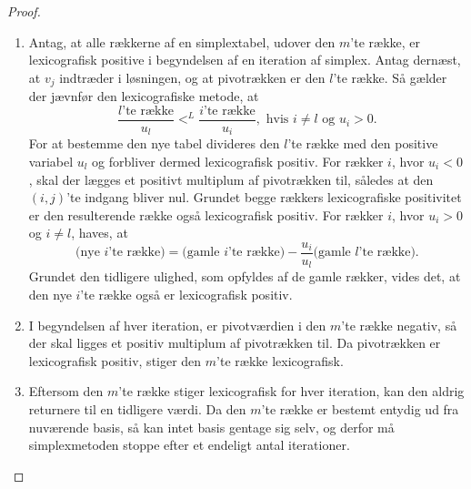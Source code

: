 \begin{proof}
\begin{enumerate}[label=(\alph*)]
\item Antag, at alle rækkerne af en simplextabel, udover den $m$'te række, er lexicografisk positive i begyndelsen af en iteration af simplex. 
Antag dernæst, at $v_j$ indtræder i løsningen, og at pivotrækken er den $l$'te række.
Så gælder der jævnfør den lexicografiske metode, at
$$\dfrac{l\text{'te række}}{u_l}<^L \dfrac{i\text{'te række}}{u_i}, \text{  hvis } i\neq l \text{ og }u_i>0.$$
For at bestemme den nye tabel divideres den $l$'te række med den positive variabel $u_l$ og forbliver dermed lexicografisk positiv.
For rækker $i$, hvor $u_i<0$, skal der lægges et positivt multiplum af pivotrækken til, således at den $(i,j)$'te indgang bliver nul. 
Grundet begge rækkers lexicografiske positivitet er den resulterende række også lexicografisk positiv. 
For rækker $i$, hvor $u_i>0$ og $i\neq l$, haves, at
$$\text{(nye }i\text{'te række)}=\text{(gamle }i\text{'te række)}-\dfrac{u_i}{u_l}\text{(gamle }l\text{'te række)}.$$
Grundet den tidligere ulighed, som opfyldes af de gamle rækker, vides det, at den nye $i$'te række også er lexicografisk positiv.
% 
\item I begyndelsen af hver iteration, er pivotværdien i den $m$'te række negativ, så der skal ligges et positiv multiplum af pivotrækken til. 
Da pivotrækken er lexicografisk positiv, stiger den $m$'te række lexicografisk.
% 
\item Eftersom den $m$'te række stiger lexicografisk for hver iteration, kan den aldrig returnere til en tidligere værdi.
Da den $m$'te række er bestemt entydig ud fra nuværende basis, så kan intet basis gentage sig selv, og derfor må simplexmetoden stoppe efter et endeligt antal iterationer.
\end{enumerate}
\end{proof}
%
%
%
%
%
\newpage